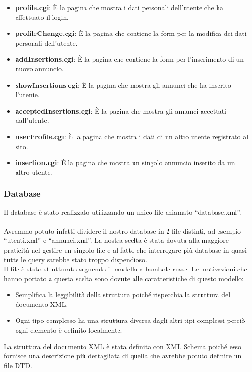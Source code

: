 \documentclass[12pt]{article}
\begin{document}
		\begin{itemize}
			\item \textbf{profile.cgi}: È la pagina che mostra i dati personali dell'utente che ha effettuato il login.
			\item \textbf{profileChange.cgi}: È la pagina che contiene la form per la modifica dei dati personali dell'utente.
			\item \textbf{addInsertions.cgi}: È la pagina che contiene la form per l'inserimento di un nuovo annuncio.
			\item \textbf{showInsertions.cgi}: È la pagina che mostra gli annunci che ha inserito l'utente.
			\item \textbf{acceptedInsertions.cgi}: È la pagina che mostra gli annunci accettati dall'utente.
			\item \textbf{userProfile.cgi}: È la pagina che mostra i dati di un altro utente registrato al sito.
			\item \textbf{insertion.cgi}: È la pagina che mostra un singolo annuncio inserito da un altro utente.
		\end{itemize}
		
	
		\subsubsection{Database}
		Il database è stato realizzato utilizzando un unico file chiamato “database.xml”.\\\\
		Avremmo potuto infatti dividere il nostro database in 2 file distinti, ad esempio “utenti.xml” e “annunci.xml”.
		La nostra scelta è stata dovuta alla maggiore praticità nel gestire un singolo file e al fatto che interrogare più database in quasi tutte le query sarebbe stato troppo dispendioso.\\
		Il file è stato strutturato seguendo il modello a bambole russe.
		Le motivazioni che hanno portato a questa scelta sono dovute alle caratteristiche di questo modello:
		\begin{itemize}
			\item Semplifica la leggibilità della struttura poiché rispecchia la struttura del documento XML.
			\item Ogni tipo complesso ha una struttura diversa dagli altri tipi complessi perciò ogni elemento è definito localmente.\\
		\end{itemize}
		La struttura del documento XML è stata definita con XML Schema poiché esso fornisce una descrizione più dettagliata di quella che avrebbe potuto definire un file DTD.
\end{document}
